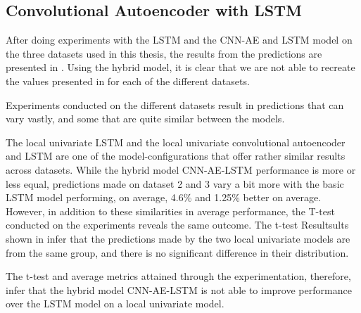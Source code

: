 
\subsection{Convolutional Autoencoder with LSTM}
\label{section:Discussion:Discussion:CNN-AE-LSTM}





After doing experiments with the LSTM and the CNN-AE and LSTM model on the three datasets used in this thesis,
the results from the predictions are presented in .
Using the hybrid model, it is clear that we are not able to recreate the values presented in \cite{Zhao2019}
for each of the different datasets.

Experiments conducted on the different datasets result in predictions that can vary vastly,
and some that are quite similar between the models.

The local univariate LSTM and the local univariate convolutional autoencoder and LSTM are one of the model-configurations
that offer rather similar results across datasets.
While the hybrid model CNN-AE-LSTM performance is more or less equal, predictions made on dataset 2 and 3 vary a bit more
with the basic LSTM model performing, on average, 4.6\% and 1.25\% better on average.
However, in addition to these similarities in average performance, the T-test conducted on the experiments reveals the same outcome.
The t-test Resultsults shown in  infer that the predictions made by the two local univariate models
are from the same group, and there is no significant difference in their distribution.

The t-test and average metrics attained through the experimentation, therefore, infer that the hybrid model CNN-AE-LSTM
is not able to improve performance over the LSTM model on a local univariate model.


